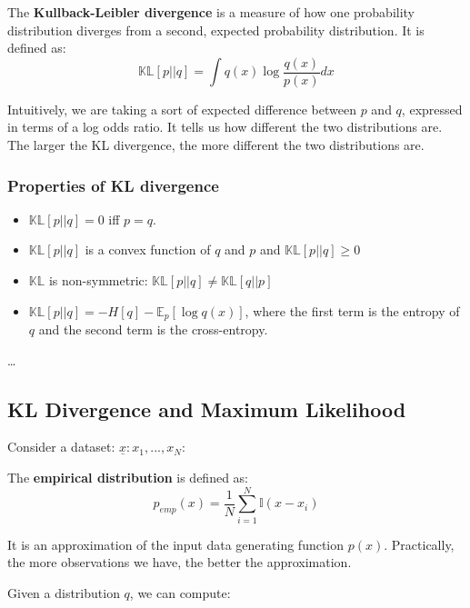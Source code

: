 \begin{definitionblock}
The \textbf{Kullback-Leibler divergence} is a measure of how one probability distribution diverges from a second, expected probability distribution. It is defined as:
$$
\mathbb{KL}[p||q] = \int q(x) \log \dfrac{q(x)}{p(x)} dx
$$
\end{definitionblock}

Intuitively, we are taking a sort of expected difference between $p$ and $q$, expressed in terms of a log odds ratio. It tells us how different the two distributions are. The larger the KL divergence, the more different the two distributions are.

\subsubsection{Properties of KL divergence}
\begin{itemize}
    \item $\mathbb{KL}[p||q] = 0$ iff $p = q$.
    \item $\mathbb{KL}[p||q]$ is a convex function of $q$ and $p$ and $\mathbb{KL}[p||q] \ge 0$
    \item $\mathbb{KL}$ is non-symmetric: $\mathbb{KL}[p||q] \neq \mathbb{KL}[q||p]$
    \item $\mathbb{KL}[p||q] = -H[q] - \mathbb{E}_{p}[\log q(x)]$, where the first term is the entropy of $q$ and the second term is the cross-entropy.
\end{itemize}

\vspace{10em}
\dots
\vspace{10em}

\subsection{KL Divergence and Maximum Likelihood}

Consider a dataset: $\underline{x} : x_1, ..., x_N$:

\begin{definitionblock}
The \textbf{empirical distribution} is defined as:
$$
p_{emp}(x) = \dfrac 1N \sum_{i=1}^N \mathbb{I}(x - x_i)
$$
\end{definitionblock}

It is an approximation of the input data generating function $p(x)$. Practically, the more observations we have, the better the approximation.

Given a distribution $q$, we can compute:

